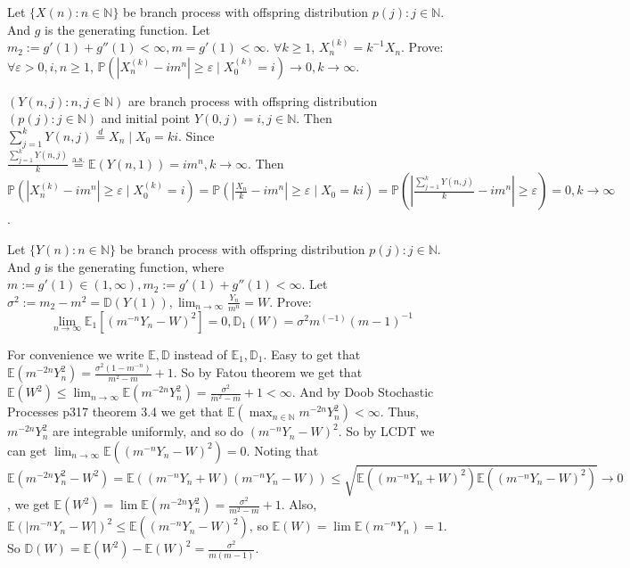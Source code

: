 \documentclass{ctexart}
\begin{document}
\begin{problem}\label{pro:3}
  Let \(\{X(n): n \in \mathbb{N}\}\) be branch process with offspring distribution \(p(j): j \in \mathbb{N}\).
  And \(g\) is the generating function. Let \(m_2:=g'(1) + g''(1) < \infty,m=g'(1)<\infty\).
  \(\forall k \geq 1\), \(X_n^{(k)}=k^{-1}X_n\).
  Prove: \(\forall \varepsilon >0, i,n \geq 1\), \(\mathbb{P}(|X_n^{(k)} -im^n| \geq \varepsilon \mid X_0^{(k)}=i) \to 0, k \to \infty\).
\end{problem}
\begin{solution}
  \((Y(n,j):n,j \in \mathbb{N})\) are branch process with offspring distribution \((p(j):j \in \mathbb{N})\)
  and initial point \(Y(0,j)=i,j \in \mathbb{N}\).
  Then \(\sum_{j=1}^{k} Y(n,j) \overset{d}{=} X_n \mid X_0=ki\).
  Since \(\frac{\sum_{j=1}^{k} Y(n,j)}{k} \overset{\text{a.s.}}{=} \mathbb{E}(Y(n,1))=im^n ,k \to \infty\).
  Then \(\mathbb{P}(|X_n^{(k)}-im^n| \geq \varepsilon \mid X_0^{(k)}=i)=\mathbb{P}(|\frac{X_n}{k}-im^n|\geq  \varepsilon \mid X_0=ki)=\mathbb{P}(|\frac{\sum_{j=1}^{k} Y(n,j)}{k}-im^n| \geq \varepsilon)=0, k \to \infty\).
\end{solution}

\begin{problem}\label{pro:4}
  Let \(\{Y(n): n \in \mathbb{N}\}\) be branch process with offspring distribution \(p(j): j \in \mathbb{N}\).
  And \(g\) is the generating function, where \(m :=g' (1) \in (1, \infty), m_2:=g'(1) + g''(1) < \infty\).
  Let \(\sigma^2:=m_2-m^2 = \mathbb{D}(Y(1)), \lim_{n \to \infty}\frac{Y_n}{m^n}=W\).
  Prove: \[
    \lim_{n \to \infty}\mathbb{E}_1[(m^{-n}Y_n -W)^2]= 0, \mathbb{D}_1(W)=\sigma^2 m^{(-1)}(m-1)^{-1}
  \]
\end{problem}
\begin{solution}
  For convenience we write \(\mathbb{E},\mathbb{D}\) instead of \(\mathbb{E}_1,\mathbb{D}_1\).
  Easy to get that \(\mathbb{E}(m ^{-2n} Y_n^2)=\frac{\sigma^2(1-m^{-n})}{m^2-m}+1\).
  So by Fatou theorem we get that \(\mathbb{E}(W^2) \leq \lim_{n \to \infty}\mathbb{E}(m^{-2n}Y_n^2)=\frac{\sigma^2}{m^2-m}+1<\infty\).
  And by Doob Stochastic Processes p317 theorem 3.4 we get that
  \(\mathbb{E}(\max_{n \in \mathbb{N}}m^{-2n}Y_n^2) < \infty\).
  Thus, \(m^{-2n}Y_n^2\) are integrable uniformly, and so do \((m^{-n}Y_n-W)^2\).
  So by LCDT we can get \(\lim_{n \to \infty}\mathbb{E}((m^{-n}Y_n-W)^2)=0\).
  Noting that
  \[
    \mathbb{E}(m^{-2n}Y_n^2-W^2)=\mathbb{E}((m^{-n}Y_n+W)(m^{-n}Y_n-W)) \leq \sqrt{\mathbb{E}((m^{-n}Y_n+W)^2) \mathbb{E}((m^{-n}Y_n-W)^2)} \to 0
  \]
  ,
  we get \(\mathbb{E}(W^2)=\lim \mathbb{E}(m^{-2n}Y_{n}^2)=\frac{\sigma^2}{m^2-m}+1\).
  Also, \(\mathbb{E}(|m^{-n}Y_n-W|)^2 \leq \mathbb{E}((m^{-n}Y_n-W)^2)\),
  so \(\mathbb{E}(W)=\lim \mathbb{E}(m^{-n}Y_n)=1\).
  So \(\mathbb{D}(W)=\mathbb{E}(W^2)-\mathbb{E}(W)^2=\frac{\sigma^2}{m(m-1)}\).

\end{solution}
\end{document}
